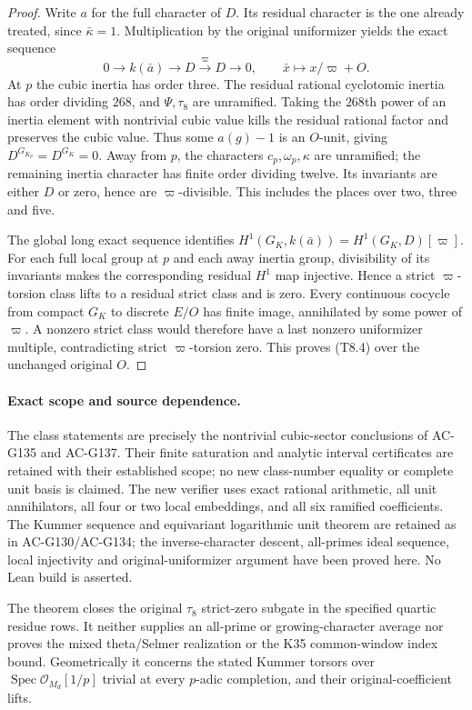 \begin{proof}
Write $a$ for the full character of $D$.  Its residual character
is the one already treated, since $\bar\kappa=1$.
Multiplication by the original uniformizer yields the exact sequence
\[
 0\longrightarrow k(\bar a)\longrightarrow D
         \xrightarrow{\varpi}D\longrightarrow0,
 \qquad \bar x\longmapsto x/\varpi+O.
 \tag{T8.24}
\]
At $p$ the cubic inertia has order three.  The residual rational cyclotomic
inertia has order dividing $268$, and $\Psi,\tau_8$ are unramified.
Taking the $268$th power of an inertia element with nontrivial cubic
value kills the residual rational factor and preserves the cubic
value.  Thus some $a(g)-1$ is an $O$-unit, giving
$D^{G_{K_p}}=D^{G_K}=0$.
Away from $p$, the characters $c_p,\omega_p,\kappa$ are unramified;
the remaining inertia character has finite order dividing twelve.
Its invariants are either $D$ or zero, hence are $\varpi$-divisible.
This includes the places over two, three and five.

The global long exact sequence identifies
$H^1(G_K,k(\bar a))=H^1(G_K,D)[\varpi]$.
For each full local group at $p$ and each away inertia group,
divisibility of its invariants makes the corresponding residual
$H^1$ map injective.  Hence a strict $\varpi$-torsion class lifts
to a residual strict class and is zero.
Every continuous cocycle from compact $G_K$ to discrete $E/O$
has finite image, annihilated by some power of $\varpi$.
A nonzero strict class would therefore have a last nonzero
uniformizer multiple, contradicting strict $\varpi$-torsion zero.
This proves (T8.4) over the unchanged original $O$.
\end{proof}

\paragraph{Exact scope and source dependence.}
The class statements are precisely the nontrivial cubic-sector
conclusions of AC-G135 and AC-G137.  Their finite saturation and
analytic interval certificates are retained with their established
scope; no new class-number equality or complete unit basis is claimed.
The new verifier uses exact rational arithmetic, all unit annihilators,
all four or two local embeddings, and all six ramified coefficients.
The Kummer sequence and equivariant logarithmic unit theorem are
retained as in AC-G130/AC-G134; the inverse-character descent,
all-primes ideal sequence, local injectivity and original-uniformizer
argument have been proved here.  No Lean build is asserted.

The theorem closes the original $\tau_8$ strict-zero subgate in the
specified quartic residue rows.  It neither supplies an all-prime
or growing-character average nor proves the mixed theta/Selmer
realization or the K35 common-window index bound.
Geometrically it concerns the stated Kummer torsors over
$\operatorname{Spec}\mathcal O_{M_d}[1/p]$ trivial at every
$p$-adic completion, and their original-coefficient lifts.
